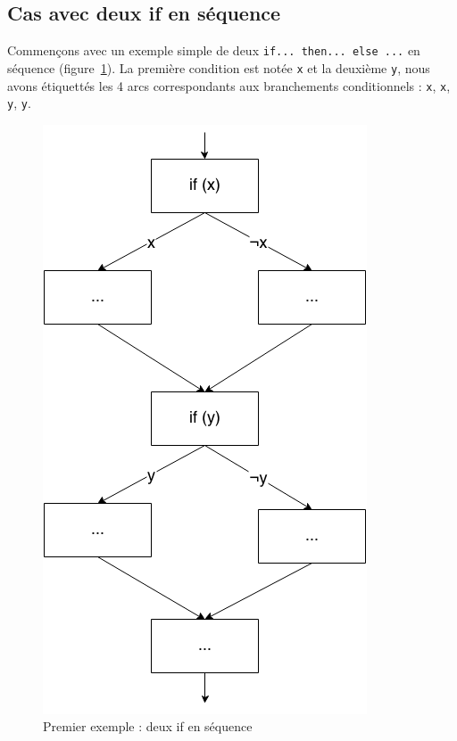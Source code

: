 \documentclass[french]{article}
\begin{document}

  \subsection{Cas avec deux if en séquence}
  Commençons avec un exemple simple de deux \texttt{if... then... else ...} en séquence (figure~\ref{if_2seq}). La première condition est notée \texttt{x} et la deuxième \texttt{y}, nous avons étiquettés les 4 arcs correspondants aux branchements conditionnels : \texttt{x}, \texttt{\textlnot x}, \texttt{y}, \texttt{\textlnot y}.


  \begin{figure}
    \centering
    \includegraphics[scale=0.4]{./pictures/if_2seq.png}
    \caption{Premier exemple : deux if en séquence}
    \label{if_2seq}
  \end{figure}
\end{document}
